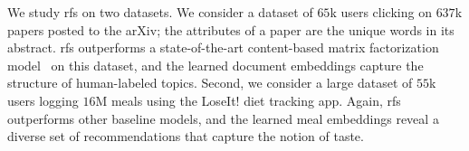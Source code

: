 We study \gls{rfs} on two datasets. We consider a dataset of $65$k users
clicking on $637$k papers posted to the arXiv; the attributes of a paper are the
unique words in its abstract. \gls{rfs} outperforms a state-of-the-art
content-based matrix factorization model~\cite{gopalan2014content-based} on this
dataset, and the learned document embeddings capture the structure of
human-labeled topics. Second, we consider a large dataset of $55$k users logging
$16$M meals using the LoseIt! diet tracking app. Again, \gls{rfs} outperforms
other baseline models, and the learned meal embeddings reveal a diverse set of
recommendations that capture the notion of taste.






